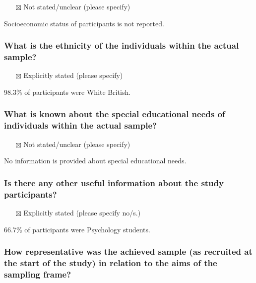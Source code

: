\documentclass[
  doc, a4paper]{apa7}
\providecommand{\tightlist}{%
  \setlength{\itemsep}{0pt}\setlength{\parskip}{0pt}}
\begin{document}
\begin{itemize}
\tightlist
\item[$\boxtimes$]
  Not stated/unclear (please specify)
\end{itemize}

Socioeconomic status of participants is not reported.

\subsubsection{What is the ethnicity of the individuals within the actual sample?}\label{what-is-the-ethnicity-of-the-individuals-within-the-actual-sample}

\begin{itemize}
\tightlist
\item[$\boxtimes$]
  Explicitly stated (please specify)
\end{itemize}

98.3\% of participants were White British.

\subsubsection{What is known about the special educational needs of individuals within the actual sample?}\label{what-is-known-about-the-special-educational-needs-of-individuals-within-the-actual-sample}

\begin{itemize}
\tightlist
\item[$\boxtimes$]
  Not stated/unclear (please specify)
\end{itemize}

No information is provided about special educational needs.

\subsubsection{Is there any other useful information about the study participants?}\label{is-there-any-other-useful-information-about-the-study-participants}

\begin{itemize}
\tightlist
\item[$\boxtimes$]
  Explicitly stated (please specify no/s.)
\end{itemize}

66.7\% of participants were Psychology students.

\subsubsection{How representative was the achieved sample (as recruited at the start of the study) in relation to the aims of the sampling frame?}\label{how-representative-was-the-achieved-sample-as-recruited-at-the-start-of-the-study-in-relation-to-the-aims-of-the-sampling-frame}
\end{document}
